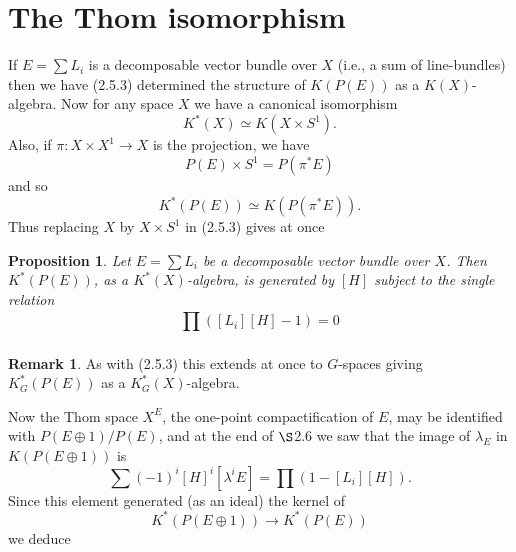 \documentclass[leqno]{book}
\numberwithin{equation}{section}
\newtheorem{proposition}[theorem]{Proposition}
\theoremstyle{definition}
\newtheorem*{remark}{Remark}
\begin{document}
        \section{The Thom isomorphism}
            
            If $E=\sum L_{i}$ is a decomposable vector bundle over $X$ (i.e., a sum of line-bundles) then we have (2.5.3) determined the structure of $K(P(E))$ as a $K(X)$-algebra. Now for any space $X$ we have a canonical isomorphism
            \begin{equation*}
              K^{*}(X)\simeq K(X\times S^{1}).
            \end{equation*} 
            Also, if $\pi:X\times X^{1}\to X$ is the projection, we have
            \begin{equation*}
              P(E)\times S^{1}=P(\pi^{*}E)
            \end{equation*}
            and so
            \begin{equation*}
              K^{*}(P(E))\simeq K(P(\pi^{*}E)).
            \end{equation*}
            Thus replacing $X$ by $X\times S^{1}$ in (2.5.3) gives at once

            \begin{proposition}
              Let $E=\sum L_{i}$ be a decomposable vector bundle over $X$. Then $K^{*}(P(E))$, as a $K^{*}(X)$-algebra, is generated by $[H]$ subject to the single relation
              \begin{equation*}
                \prod_{}^{} ([L_{i}][H]-1)=0
              \end{equation*}
            \end{proposition}

            \begin{remark}
              As with (2.5.3) this extends at once to $G$-spaces giving $K_{G}^{*}(P(E))$ as a $K_{G}^{*}(X)$-algebra.
            \end{remark}

            Now the Thom space $X^{E}$, the one-point compactification of $E$, may be identified with $P(E \oplus 1)/P(E)$, and at the end of $\S$2.6 we saw that the image of $\lambda _{E}$ in $K(P(E\oplus 1))$ is
            \begin{equation*}
              \sum (-1)^{i}[H]^{i}[\lambda^{i}E]=\prod (1-[L_{i}][H]).
            \end{equation*}
            Since this element generated (as an ideal) the kernel of
            \begin{equation*}
              K^{*}(P(E\oplus 1))\to K^{*}(P(E))
            \end{equation*}
            we deduce
\end{document}
